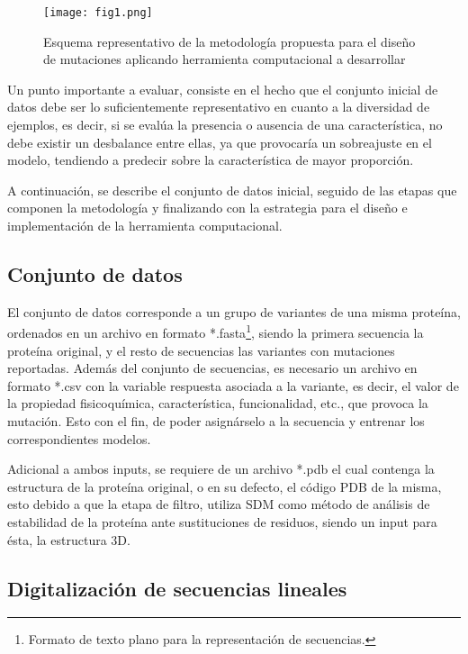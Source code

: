 \begin{figure}[!h]
	
	\centering
	\texttt{[image: fig1.png]}
	\caption{Esquema representativo de la metodología propuesta para el diseño de mutaciones aplicando herramienta computacional a desarrollar}
	\label{cap4:fig1}
\end{figure}

Un punto importante a evaluar, consiste en el hecho que el conjunto inicial de datos debe ser lo suficientemente representativo en cuanto a la diversidad de ejemplos, es decir, si se evalúa la presencia o ausencia de una característica, no debe existir un desbalance entre ellas, ya que provocaría un sobreajuste en el modelo, tendiendo a predecir sobre la característica de mayor proporción.

A continuación, se describe el conjunto de datos inicial, seguido de las etapas que componen la metodología y finalizando con la estrategia para el diseño e implementación de la herramienta computacional.

\subsection{Conjunto de datos}

El conjunto de datos corresponde a un grupo de variantes de una misma proteína, ordenados en un archivo en formato *.fasta\footnote{Formato de texto plano para la representación de secuencias.}, siendo la primera secuencia la proteína original, y el resto de secuencias las variantes con mutaciones reportadas. Además del conjunto de secuencias, es necesario un archivo en formato *.csv con la variable respuesta asociada a la variante, es decir, el valor de la propiedad fisicoquímica, característica, funcionalidad, etc., que provoca la mutación. Esto con el fin, de poder asignárselo a la secuencia y entrenar los correspondientes modelos. 

Adicional a ambos inputs, se requiere de un archivo *.pdb el cual contenga la estructura de la proteína original, o en su defecto, el código PDB de la misma, esto debido a que la etapa de filtro, utiliza SDM como método de análisis de estabilidad de la proteína ante sustituciones de residuos, siendo un input para ésta, la estructura 3D.

\subsection{Digitalización de secuencias lineales}

